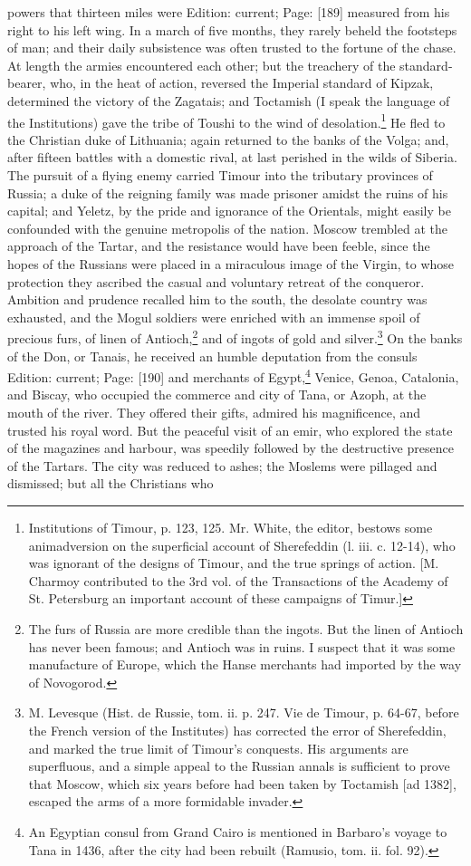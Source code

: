 powers that thirteen miles were Edition: current; Page: [189] measured from his right to his left wing. In a march of five months, they rarely beheld the footsteps of man; and their daily subsistence was often trusted to the fortune of the chase. At length the armies encountered each other; but the treachery of the standard-bearer, who, in the heat of action, reversed the Imperial standard of Kipzak, determined the victory of the Zagatais; and Toctamish (I speak the language of the Institutions) gave the tribe of Toushi to the wind of desolation.\footnote{Institutions of Timour, p. 123, 125. Mr. White, the editor, bestows some animadversion on the superficial account of Sherefeddin (l. iii. c. 12-14), who was ignorant of the designs of Timour, and the true springs of action. [M. Charmoy contributed to the 3rd vol. of the Transactions of the Academy of St. Petersburg an important account of these campaigns of Timur.]} He fled to the Christian duke of Lithuania; again returned to the banks of the Volga; and, after fifteen battles with a domestic rival, at last perished in the wilds of Siberia. The pursuit of a flying enemy carried Timour into the tributary provinces of Russia; a duke of the reigning family was made prisoner amidst the ruins of his capital; and Yeletz, by the pride and ignorance of the Orientals, might easily be confounded with the genuine metropolis of the nation. Moscow trembled at the approach of the Tartar, and the resistance would have been feeble, since the hopes of the Russians were placed in a miraculous image of the Virgin, to whose protection they ascribed the casual and voluntary retreat of the conqueror. Ambition and prudence recalled him to the south, the desolate country was exhausted, and the Mogul soldiers were enriched with an immense spoil of precious furs, of linen of Antioch,\footnote{The furs of Russia are more credible than the ingots. But the linen of Antioch has never been famous; and Antioch was in ruins. I suspect that it was some manufacture of Europe, which the Hanse merchants had imported by the way of Novogorod.} and of ingots of gold and silver.\footnote{M. Levesque (Hist. de Russie, tom. ii. p. 247. Vie de Timour, p. 64-67, before the French version of the Institutes) has corrected the error of Sherefeddin, and marked the true limit of Timour\texthebrew{}’s conquests. His arguments are superfluous, and a simple appeal to the Russian annals is sufficient to prove that Moscow, which six years before had been taken by Toctamish [ad 1382], escaped the arms of a more formidable invader.} On the banks of the Don, or Tanais, he received an humble deputation from the consuls Edition: current; Page: [190] and merchants of Egypt,\footnote{An Egyptian consul from Grand Cairo is mentioned in Barbaro\texthebrew{}’s voyage to Tana in 1436, after the city had been rebuilt (Ramusio, tom. ii. fol. 92).} Venice, Genoa, Catalonia, and Biscay, who occupied the commerce and city of Tana, or Azoph, at the mouth of the river. They offered their gifts, admired his magnificence, and trusted his royal word. But the peaceful visit of an emir, who explored the state of the magazines and harbour, was speedily followed by the destructive presence of the Tartars. The city was reduced to ashes; the Moslems were pillaged and dismissed; but all the Christians who 